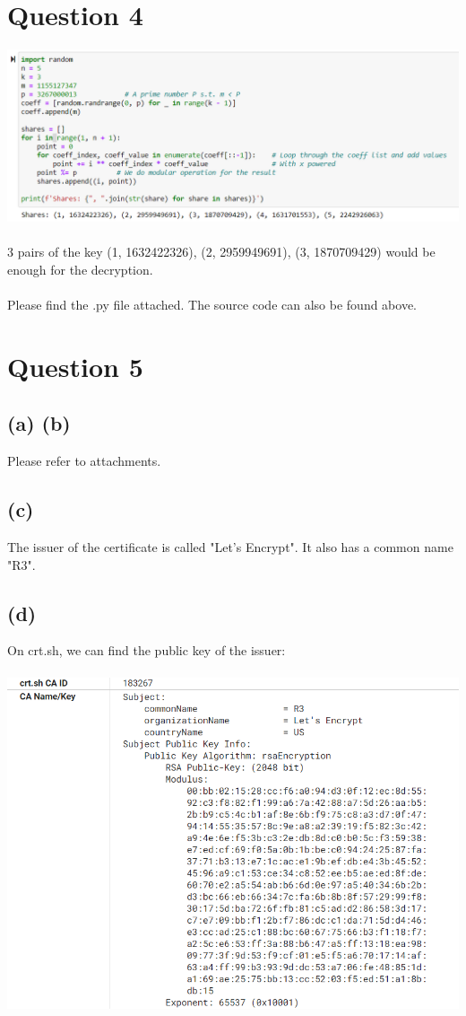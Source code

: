 \documentclass[a4paper]{article}
\begin{document}
\section*{Question 4}
\includegraphics[scale=0.6]{1.png}\\\\
3 pairs of the key (1, 1632422326), (2, 2959949691), (3, 1870709429) would be enough for the decryption.\\\\
Please find the .py file attached. The source code can also be found above.

\section*{Question 5}
\subsection*{(a) (b)}
Please refer to attachments.
\subsection*{(c)}
The issuer of the certificate is called "Let's Encrypt". It also has a common name "R3".
\subsection*{(d)}
On crt.sh, we can find the public key of the issuer:\\\\
\includegraphics[scale=0.6]{3.png}
\pagebreak
\end{document}
